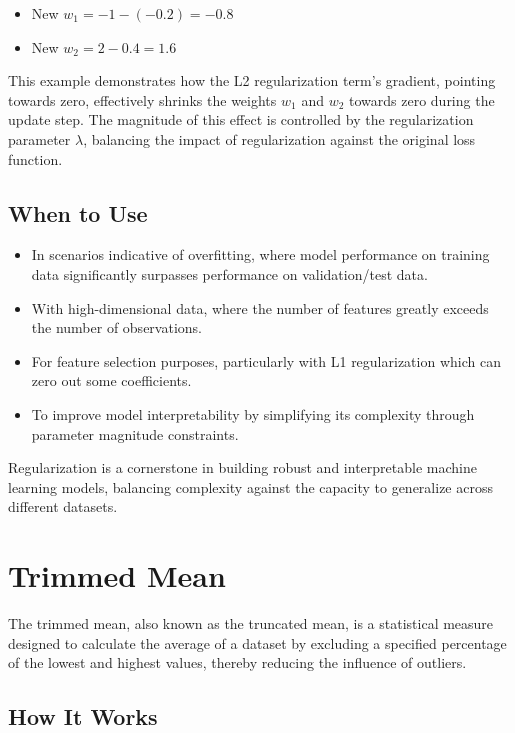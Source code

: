 \documentclass[12pt]{article}
\begin{document}
\begin{itemize}
    \item New \(w_1 = -1 - (-0.2) = -0.8\)
    \item New \(w_2 = 2 - 0.4 = 1.6\)
\end{itemize}

This example demonstrates how the L2 regularization term's gradient, pointing towards zero, effectively shrinks the weights \(w_1\) and \(w_2\) towards zero during the update step. The magnitude of this effect is controlled by the regularization parameter \(\lambda\), balancing the impact of regularization against the original loss function.


\subsection{When to Use}

\begin{itemize}
    \item In scenarios indicative of overfitting, where model performance on training data significantly surpasses performance on validation/test data.
    \item With high-dimensional data, where the number of features greatly exceeds the number of observations.
    \item For feature selection purposes, particularly with L1 regularization which can zero out some coefficients.
    \item To improve model interpretability by simplifying its complexity through parameter magnitude constraints.
\end{itemize}

Regularization is a cornerstone in building robust and interpretable machine learning models, balancing complexity against the capacity to generalize across different datasets.

\section{Trimmed Mean}

The trimmed mean, also known as the truncated mean, is a statistical measure designed to calculate the average of a dataset by excluding a specified percentage of the lowest and highest values, thereby reducing the influence of outliers.

\subsection{How It Works}
\end{document}
